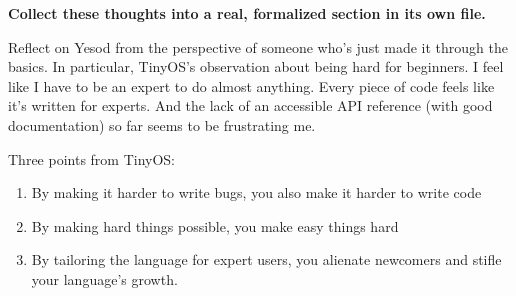 \documentclass{article}
\newcommand {\todo}[1] {{\textbf{\color{red}#1}}}
\begin{document}
\todo{Collect these thoughts into a real, formalized section in its own file.}

Reflect on Yesod from the perspective of someone who's just made it through the basics. In particular, TinyOS's observation about being hard for beginners. I feel like I have to be an expert to do almost anything. Every piece of code feels like it's written for experts. And the lack of an accessible API reference (with good documentation) so far seems to be frustrating me.

Three points from TinyOS:
\begin{enumerate}
  \item By making it harder to write bugs, you also make it harder to write code
  \item By making hard things possible, you make easy things hard
  \item By tailoring the language for expert users, you alienate newcomers and stifle your language's growth.
\end{enumerate}

% 
% 
% 
% 

\printbibliography
\end{document}
